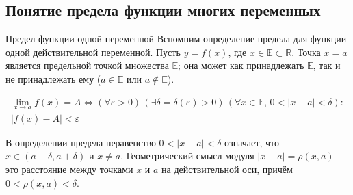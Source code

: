 \subsection{Понятие предела функции многих переменных} \label{sec:1.3}
\begin{tbox}{Предел функции одной переменной}
	Вспомним определение предела для функции одной действительной переменной. Пусть \( y = f(x) \), где \( x \in \mathbb{E} \subset \mathbb{R} \). Точка \( x = a \) является предельной точкой множества \( \mathbb{E} \); она может как принадлежать \( \mathbb{E} \), так и не принадлежать ему (\( a \in \mathbb{E} \) или \( a \notin \mathbb{E} \)).

	\begin{multline} \label{eq:1.3.1}
		\lim_{x \to a} f(x) = A \Leftrightarrow
		(\forall \varepsilon > 0) \, (\exists \delta = \delta(\varepsilon) > 0) \,
		(\forall x \in \mathbb{E}, \, 0 < |x - a| < \delta) : \\
		|f(x) - A| < \varepsilon
	\end{multline}

	В определении предела неравенство \( 0 < |x - a| < \delta \) означает, что \( x \in (a - \delta, a + \delta) \) и \( x \neq a \). Геометрический смысл модуля \( |x - a| = \rho(x, a) \) — это расстояние между точками \( x \) и \( a \) на действительной оси, причём \( 0 < \rho(x, a) < \delta \).
\end{tbox}

